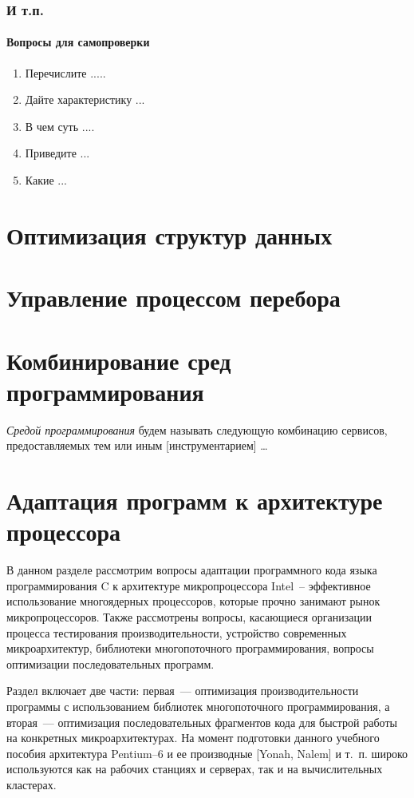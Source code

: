 \documentclass[14pt, a4paper, openany, twoside, draft]{extbook} %
\newcommand{\e}[2][fcolor]{\textcolor{pcolor}{[}\textcolor{#1}{#2}\textcolor{pcolor}{]}}
\newenvironment{questions}{\subsubsection*{Вопросы для самопроверки}\begin{enumerate}\itemsep0pt minus 0.3pt\parskip0pt plus 0.3pt}{\end{enumerate}}
\begin{document}
\subsection{И т.п.}


\begin{questions}
\item{} Перечислите .....
\item{} Дайте характеристику ...
\item{} В чем суть ....
\item{} Приведите ...
\item{} Какие ...
\end{questions}

\chapter{Оптимизация структур данных}

\chapter{Управление процессом перебора}

\chapter{Комбинирование сред программирования}

\emph{Средой программирования} будем называть следующую комбинацию сервисов, предоставляемых тем или иным \e{инструментарием} \ldots{}

\chapter{Адаптация программ к архитектуре процессора}
\label{cha:CPU}

В данном разделе рассмотрим вопросы адаптации программного кода языка программирования C к архитектуре микропроцессора Intel~-- эффективное использование многоядерных процессоров, которые прочно занимают рынок микропроцессоров.  Также рассмотрены вопросы, касающиеся организации процесса тестирования производительности, устройство современных микроархитектур, библиотеки многопоточного программирования, вопросы оптимизации последовательных программ.

Раздел включает две части: первая~--- оптимизация производительности программы с использованием библиотек многопоточного программирования, а вторая~--- оптимизация последовательных фрагментов кода для быстрой работы на конкретных микроархитектурах.   На момент подготовки данного учебного пособия архитектура Pentium--6 и ее производные \e{Yonah, Nalem} и т.~п. широко используются как на рабочих станциях и серверах, так и на вычислительных кластерах.
\end{document}
